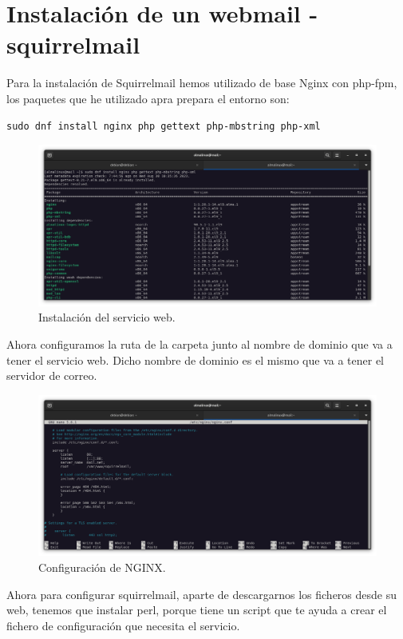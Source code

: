 \newpage
\section{Instalación de un webmail - squirrelmail}

Para la instalación de Squirrelmail hemos utilizado de base Nginx con php-fpm, los paquetes que he utilizado apra prepara el entorno son:

\begin{lstlisting}[style=mybash]
sudo dnf install nginx php gettext php-mbstring php-xml
\end{lstlisting}

\begin{figure}[H]
	\centering
	\includegraphics[scale=0.30]{21}
	\caption{Instalación del servicio web.}
\end{figure}

Ahora configuramos la ruta de la carpeta junto al nombre de dominio que va a tener el servicio web. Dicho nombre de dominio es el mismo que va a tener el servidor de correo.

\begin{figure}[H]
	\centering
	\includegraphics[scale=0.30]{22}
	\caption{Configuración de NGINX.}
\end{figure}

Ahora para configurar squirrelmail, aparte de descargarnos los ficheros desde su web, tenemos que instalar perl, porque tiene un script que te ayuda a crear el fichero de configuración que necesita el servicio.

